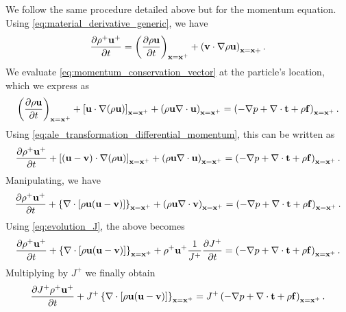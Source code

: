 \documentclass[oneside,a4paper,11pt]{report}
\begin{document}
We follow the same procedure detailed above but for the momentum equation. Using \cref{eq:material_derivative_generic}, we have
\begin{equation}
\label{eq:ale_transformation_differential_momentum}
    \frac{\partial \rho^+ \mathbf{u}^+}{\partial t} = \left ( \frac{\partial \rho \mathbf{u}}{\partial t} \right )_{\mathbf{x} = \mathbf{x}^+} + \left(\mathbf{v} \cdot \nabla \rho \mathbf{u} \right)_{\mathbf{x} = \mathbf{x} +}.
\end{equation}
We evaluate \cref{eq:momentum_conservation_vector} at the particle's location, which we express as
\begin{equation}
\left ( \frac{\partial \rho\mathbf{u} }{\partial t} \right )_{\mathbf{x} = \mathbf{x}^+} + \left [ \mathbf{u} \cdot \nabla (\rho\mathbf{u} ) \right]_{\mathbf{x} = \mathbf{x}^+} + \left ( \rho \mathbf{u} \nabla \cdot \mathbf{u} \right)_{\mathbf{x} = \mathbf{x}^+} = \left ( -\nabla p + \nabla\cdot \mathbf{t} +\rho \mathbf{f} \right)_{\mathbf{x} = \mathbf{x}^+}.
\end{equation}
Using \cref{eq:ale_transformation_differential_momentum}, this can be written as
\begin{equation}
\frac{\partial \rho^+ \mathbf{u}^+}{\partial t} + \left [ (\mathbf{u} - \mathbf{v}) \cdot \nabla (\rho\mathbf{u} ) \right]_{\mathbf{x} = \mathbf{x}^+} + \left ( \rho \mathbf{u} \nabla \cdot \mathbf{u} \right)_{\mathbf{x} = \mathbf{x}^+} = \left ( -\nabla p + \nabla\cdot \mathbf{t} +\rho \mathbf{f} \right)_{\mathbf{x} = \mathbf{x}^+}.
\end{equation}
Manipulating, we have
\begin{equation}
\frac{\partial \rho^+ \mathbf{u}^+}{\partial t} + \left \{ \nabla \cdot [\rho \mathbf{u} (\mathbf{u} - \mathbf{v}) ] \right \}_{\mathbf{x} = \mathbf{x}^+} + \left ( \rho \mathbf{u} \nabla \cdot \mathbf{v} \right)_{\mathbf{x} = \mathbf{x}^+} = \left ( -\nabla p + \nabla\cdot \mathbf{t} +\rho \mathbf{f} \right)_{\mathbf{x} = \mathbf{x}^+}.
\end{equation}
Using \cref{eq:evolution_J}, the above becomes
\begin{equation}
\frac{\partial \rho^+ \mathbf{u}^+}{\partial t} + \left \{ \nabla \cdot [\rho \mathbf{u} (\mathbf{u} - \mathbf{v}) ] \right \}_{\mathbf{x} = \mathbf{x}^+} + \rho^+ \mathbf{u}^+ \frac{1}{J^+} \frac{\partial J^+}{\partial t} = \left ( -\nabla p + \nabla\cdot \mathbf{t} +\rho \mathbf{f} \right)_{\mathbf{x} = \mathbf{x}^+}.
\end{equation}
Multiplying by $J^+$ we finally obtain 
\begin{equation}
\frac{\partial J^+ \rho^+ \mathbf{u}^+}{\partial t} + J^+ \left \{ \nabla \cdot [\rho \mathbf{u} (\mathbf{u} - \mathbf{v}) ] \right \}_{\mathbf{x} = \mathbf{x}^+} = J^+ \left ( -\nabla p + \nabla\cdot \mathbf{t} +\rho \mathbf{f} \right)_{\mathbf{x} = \mathbf{x}^+}.
\end{equation}
\end{document}
